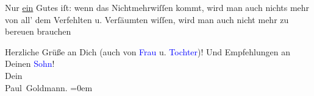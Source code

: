 \pstart
           {\pb}Nur \uline{ein} Gutes
               iſt: wenn das \strikeout{\textcolor{gray}{gramſte}} Nichtmehrwiſſen kommt, wird man auch nichts mehr von all’ dem Verfehlten u.
               Verſäumten wiſſen, wird man auch nicht mehr zu bereuen brauchen{\dotsfive}\pend
           
\pstart
           Herzliche Grüße an Dich (auch von \textcolor{blue}{Frau}{}\ledrightnote{{$\rightarrow$}\textcolor{blue}{Eva Marie Goldmann}} u. \textcolor{blue}{Tochter}{}\ledrightnote{{$\rightarrow$}\textcolor{blue}{Franziska Goldmann}})! Und Empfehlungen an Deinen \textcolor{blue}{Sohn}{}\ledrightnote{{$\rightarrow$}\textcolor{blue}{Heinrich Schnitzler}}! {\\[\baselineskip]}Dein {\\[\baselineskip]}\spacefill\mbox{Paul Goldmann.}\pend
           \leftskip=0em{}\endnumbering{}
\begin{anhang}
\end{anhang}
      